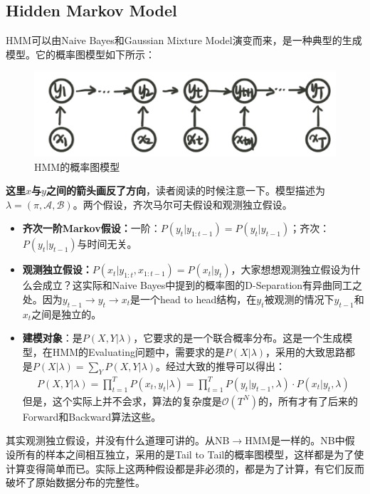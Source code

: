 \documentclass[a4paper]{article}
\begin{document}
\subsection{Hidden Markov Model}
HMM可以由Naive Bayes和Gaussian Mixture Model演变而来，是一种典型的生成模型。它的概率图模型如下所示：
\begin{figure}[H]
    \centering
    \includegraphics[width=.6\textwidth]{微信图片_20200221204618.png}
    \caption{HMM的概率图模型}
    \label{fig:my_label_1}
\end{figure}
\textbf{{\color{red}这里$x$与$y$之间的箭头画反了方向}}，读者阅读的时候注意一下。模型描述为$\lambda = (\pi,\mathcal{A},\mathcal{B})$。两个假设，齐次马尔可夫假设和观测独立假设。
\begin{itemize}
    \item \textbf{齐次一阶Markov假设：}一阶：$P(y_t|y_{1:t-1})=P(y_t|y_{t-1})$；齐次：$P(y_t|y_{t-1})$与时间无关。
    \item \textbf{观测独立假设：}$P(x_t|y_{1:t},x_{1:t-1})=P(x_t|y_t)$，大家想想观测独立假设为什么会成立？这实际和Naive Bayes中提到的概率图的D-Separation有异曲同工之处。因为$y_{t-1}\rightarrow y_t \rightarrow x_{t}$是一个head to head结构，在$y_t$被观测的情况下$y_{t-1}$和$x_t$之间是独立的。
    \item \textbf{建模对象}：是$P(X,Y|\lambda)$，它要求的是一个联合概率分布。这是一个生成模型，在HMM的Evaluating问题中，需要求的是$P(X|\lambda)$，采用的大致思路都是$P(X|\lambda) = \sum_YP(X,Y|\lambda)$。经过大致的推导可以得出：
    \begin{equation}
        \begin{split}
            P(X,Y|\lambda) =  \prod_{t=1}^T P(x_t,y_t|\lambda)
            = \prod_{t=1}^T P(y_t|y_{t-1},\lambda)\cdot P(x_t|y_t,\lambda)
        \end{split}
    \end{equation}
    但是，这个实际上并不会求，算法的复杂度是$\mathcal{O}(T^N)$的，所有才有了后来的Forward和Backward算法这些。
\end{itemize}

其实观测独立假设，并没有什么道理可讲的。从NB$\rightarrow$HMM是一样的。NB中假设所有的样本之间相互独立，采用的是Tail to Tail的概率图模型，这样都是为了使计算变得简单而已。实际上这两种假设都是非必须的，都是为了计算，有它们反而破坏了原始数据分布的完整性。
\end{document}
